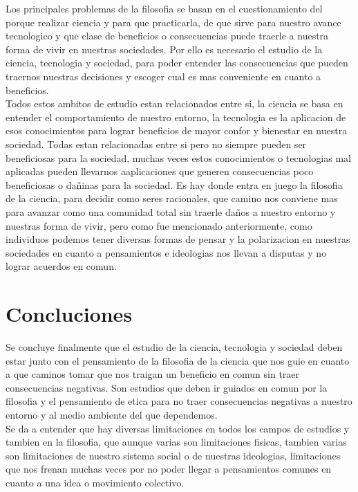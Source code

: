 Los principales problemas de la filosofia se basan en el cuestionamiento del porque realizar ciencia y para que practicarla, de que sirve para nuestro avance tecnologico y que clase de beneficios o consecuencias puede traerle a nuestra forma de vivir en nuestras sociedades.
Por ello es necesario el estudio de la ciencia, tecnologia y sociedad, para poder entender las consecuencias que pueden traernos nuestras decisiones y escoger cual es mas conveniente en cuanto a beneficios.\\
Todos estos ambitos de estudio estan relacionados entre si, la ciencia se basa en entender el comportamiento de nuestro entorno, la tecnologia es la aplicacion de esos conocimientos para lograr beneficios de mayor confor y bienestar en nuestra sociedad. Todas estan relacionadas entre si pero no siempre pueden ser beneficiosas para la sociedad, muchas veces estos conocimientos o tecnologias mal aplicadas pueden llevarnos aaplicaciones que generen consecuencias poco beneficiosas o dañinas para la sociedad. Es hay donde entra en juego la filosofia de la ciencia, para decidir como seres racionales, que camino nos conviene mas para avanzar como una comunidad total sin traerle daños a nuestro entorno y nuestras forma de vivir, pero como fue mencionado anteriormente, como individuos podemos tener diversas formas de pensar y la polarizacion en nuestras sociedades en cuanto a pensamientos e ideologias nos llevan a disputas y no lograr acuerdos en comun.

\section{Concluciones}

Se concluye finalmente que el estudio de la ciencia, tecnologia y sociedad deben estar junto con el pensamiento de la filosofia de la ciencia que nos guie en cuanto a que caminos tomar que nos traigan un beneficio en comun sin traer consecuencias negativas. Son estudios que deben ir guiados en comun por la filosofia y el pensamiento de etica para no traer consecuencias negativas a nuestro entorno y al medio ambiente del que dependemos.\\

Se da a entender que hay diversas limitaciones en todos los campos de estudios y tambien en la filosofia, que aunque varias son limitaciones fisicas, tambien varias son limitaciones de nuestro sistema social o de nuestras ideologias, limitaciones que nos frenan muchas veces por no poder llegar a pensamientos comunes en cuanto a una idea o movimiento colectivo.